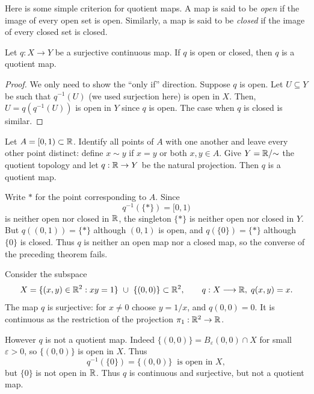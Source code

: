 Here is some simple criterion for quotient maps. A map is said to be \emph{open} if the image of every open set is open. Similarly, a map is said to be \emph{closed} if the image of every closed set is closed.

\begin{theorem}
  Let $q:X\to Y$ be a surjective continuous map. If $q$ is open or closed, then $q$ is a quotient map.
\end{theorem}
\begin{proof}
  We only need to show the ``only if'' direction. Suppose $q$ is open. Let $U\subseteq Y$ be such that $q^{-1}(U)$ (we used surjection here) is open in $X$. Then, $U=q(q^{-1}(U))$ is open in $Y$ since $q$ is open.   
  The case when $q$ is closed is similar.
\end{proof}



\begin{example}
  Let $A=[0,1)\subset\mathbb{R}$. Identify all points of $A$ with one another and leave every other point distinct: define $x\sim y$ if $x=y$ or both $x,y\in A$. Give $Y=\mathbb{R}/{\sim}$ the quotient topology and let $q:\mathbb{R}\to Y$ be the natural projection. Then $q$ is a quotient map.

  Write $*$ for the point corresponding to $A$. Since
  \[
    q^{-1}(\{*\})=[0,1)
  \]
  is neither open nor closed in $\mathbb{R}$, the singleton $\{*\}$ is neither open nor closed in $Y$.
  But $q((0,1))=\{*\}$ although $(0,1)$ is open, and $q(\{0\})=\{*\}$ although $\{0\}$ is closed. Thus $q$ is neither an open map nor a closed map, so the converse of the preceding theorem fails.
\end{example}

\begin{example}
  Consider the subspace
  \[
  X=\{(x,y)\in\mathbb{R}^2: xy=1\}\ \cup\ \{(0,0)\}\subset\mathbb{R}^2,
  \qquad
  q:X\longrightarrow \mathbb{R},\; q(x,y)=x.
  \]
  The map \(q\) is surjective: for \(x\neq 0\) choose \(y=1/x\), and \(q(0,0)=0\).
  It is continuous as the restriction of the projection \(\pi_1:\mathbb{R}^2\to\mathbb{R}\).

  However \(q\) is not a quotient map.
  Indeed \(\{(0,0)\}=B_\varepsilon(0,0)\cap X\) for small \(\varepsilon>0\), so \(\{(0,0)\}\) is open in \(X\).
  Thus
  \[
  q^{-1}(\{0\})=\{(0,0)\}\ \text{ is open in } X,
  \]
  but \(\{0\}\) is not open in \(\mathbb{R}\). Thus \(q\) is continuous and surjective, but not a quotient map.
\end{example}

